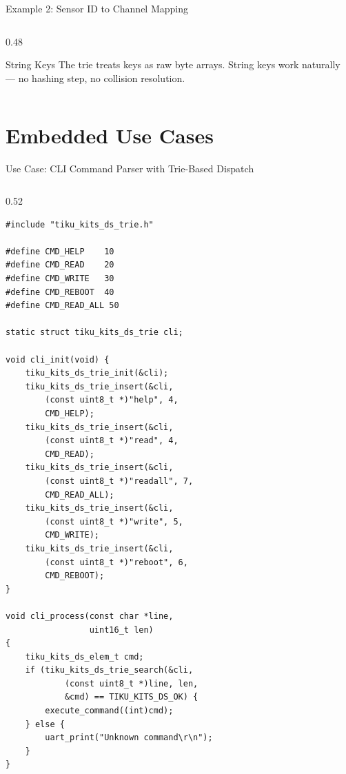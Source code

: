 \documentclass[aspectratio=169, 10pt]{beamer}
\begin{document}
\begin{frame}[fragile]{Example 2: Sensor ID to Channel Mapping}
\begin{columns}[T]
\begin{column}{0.48\textwidth}
\begin{alertblock}{String Keys}
The trie treats keys as raw byte arrays.
String keys work naturally --- no hashing
step, no collision resolution.
\end{alertblock}
\end{column}
\end{columns}
\end{frame}

\section{Embedded Use Cases}

\begin{frame}[fragile]{Use Case: CLI Command Parser with Trie-Based Dispatch}
\begin{columns}[T]
\begin{column}{0.52\textwidth}
\begin{lstlisting}[style=cstyle,
  title={UART CLI with trie-based command dispatch}]
#include "tiku_kits_ds_trie.h"

#define CMD_HELP    10
#define CMD_READ    20
#define CMD_WRITE   30
#define CMD_REBOOT  40
#define CMD_READ_ALL 50

static struct tiku_kits_ds_trie cli;

void cli_init(void) {
    tiku_kits_ds_trie_init(&cli);
    tiku_kits_ds_trie_insert(&cli,
        (const uint8_t *)"help", 4,
        CMD_HELP);
    tiku_kits_ds_trie_insert(&cli,
        (const uint8_t *)"read", 4,
        CMD_READ);
    tiku_kits_ds_trie_insert(&cli,
        (const uint8_t *)"readall", 7,
        CMD_READ_ALL);
    tiku_kits_ds_trie_insert(&cli,
        (const uint8_t *)"write", 5,
        CMD_WRITE);
    tiku_kits_ds_trie_insert(&cli,
        (const uint8_t *)"reboot", 6,
        CMD_REBOOT);
}

void cli_process(const char *line,
                 uint16_t len)
{
    tiku_kits_ds_elem_t cmd;
    if (tiku_kits_ds_trie_search(&cli,
            (const uint8_t *)line, len,
            &cmd) == TIKU_KITS_DS_OK) {
        execute_command((int)cmd);
    } else {
        uart_print("Unknown command\r\n");
    }
}
\end{lstlisting}
\end{column}


\end{columns}
\end{frame}
\end{document}
